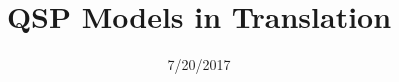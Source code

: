 \title{QSP Models in Translation} 
\date{7/20/2017} 

\newcommand{\stcolums}{\begin{columns}}
\newcommand{\fincolums}{\end{columns}}
\newcommand{\stcolum}{\begin{column}}
\newcommand{\fincolum}{\end{column}}
\newcommand{\stblock}{\begin{block}}
\newcommand{\finblock}{\end{block}}
\newcommand{\red}[1]{\textcolor{myred}{\tt #1}}
\newcommand{\redtt}[1]{\textcolor{myred}{\texttt{\textbf{#1}}}}
\newcommand{\redb}[1]{\red{{\bf #1}}}
\newcommand{\grb}[1]{\textcolor{mrggreen}{\bf #1}}
\newcommand{\ttg}[1]{\textcolor{mrggreen}{\bf \tt #1}}
\newcommand{\ttgb}[1]{\textcolor{mrggreen}{\texttt{\textbf{#1}}}}
\newcommand{\mrgsolve}{\ttg{mrgsolve}}
\newcommand{\ttdsb}[1]{\textcolor{darkslateblue}{\texttt{\textbf{#1}}}}
\newcommand{\dsbb}[1]{\textcolor{darkslateblue}{\textbf{#1}}}
\newcommand{\blkb}[1]{\textcolor{black}{\textbf{#1}}}




